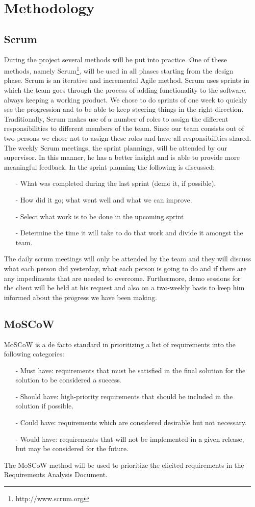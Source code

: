 \section{Methodology}
\subsection{Scrum}
During the project several methods will be put into practice. One of these methods, namely Scrum\footnote{http://www.scrum.org}, will be used in all phases starting from the design phase. Scrum is an iterative and incremental Agile method. Scrum uses sprints in which the team goes through the process of adding functionality to the software, always keeping a working product. We chose to do sprints of one week to quickly see the progression and to be able to keep steering things in the right direction. Traditionally, Scrum makes use of a number of roles to assign the different responsibilities to different members of the team. Since our team consists out of two persons we chose not to assign these roles and have all responsibilities shared. The weekly Scrum meetings, the sprint plannings, will be attended by our supervisor. In this manner, he has a better insight and  is able to provide more meaningful feedback. In the sprint planning the following is discussed:
\begin{itemize}
\item[-]What was completed during the last sprint (demo it, if possible).
\item[-]How did it go; what went well and what we can improve. 
\item[-]Select what work is to be done in the upcoming sprint
\item[-]Determine the time it will take to do that work and divide it amongst the team.
\end{itemize}
The daily scrum meetings will only be attended by the team and they will discuss what each person did yesterday, what each person is going to do and if there are any impediments that are needed to overcome. Furthermore, demo sessions for the client will be held at his request and also on a two-weekly basis to keep him informed about the progress we have been making.
\subsection{MoSCoW}
MoSCoW is a de facto standard in prioritizing a list of requirements into the following categories:
\begin{itemize}
\item[-] Must have: requirements that must be satisfied in the final solution for the solution to be considered a success.
\item[-] Should have: high-priority requirements that should be included in the solution if possible.
\item[-] Could have: requirements which are considered desirable but not necessary.
\item[-] Would have: requirements that will not be implemented in a given release, but may be considered for the future.
\end{itemize}
The MoSCoW method will be used to prioritize the elicited requirements in the Requirements Analysis Document.
